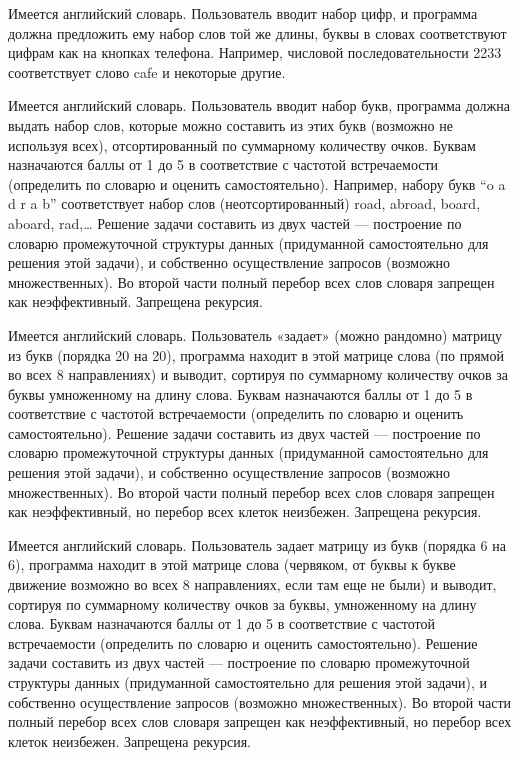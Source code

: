 Имеется английский словарь. Пользователь вводит набор цифр, и программа должна
предложить ему набор слов той же длины, буквы в словах соответствуют цифрам
как на кнопках телефона. Например, числовой последовательности 2233
соответствует слово cafe и некоторые другие.


Имеется английский словарь. Пользователь вводит набор букв, программа должна
выдать набор слов, которые можно составить из этих букв (возможно не используя
всех), отсортированный по суммарному количеству очков. Буквам назначаются
баллы от 1 до 5 в соответствие с частотой встречаемости (определить по словарю
и оценить самостоятельно). Например, набору букв “o a d r a b” соответствует
набор слов (неотсортированный) road, abroad, board, aboard, rad,… Решение
задачи составить из двух частей — построение по словарю промежуточной
структуры данных (придуманной самостоятельно для решения этой задачи), и
собственно осуществление запросов (возможно множественных). Во второй части
полный перебор всех слов словаря запрещен как неэффективный. Запрещена
рекурсия.


Имеется английский словарь. Пользователь «задает» (можно рандомно) матрицу из
букв (порядка 20 на 20), программа находит в этой матрице слова (по прямой во
всех 8 направлениях) и выводит, сортируя по суммарному количеству очков за
буквы умноженному на длину слова. Буквам назначаются баллы от 1 до 5 в
соответствие с частотой встречаемости (определить по словарю и оценить
самостоятельно). Решение задачи составить из двух частей — построение по
словарю промежуточной структуры данных (придуманной самостоятельно для решения
этой задачи), и собственно осуществление запросов (возможно множественных). Во
второй части полный перебор всех слов словаря запрещен как неэффективный, но
перебор всех клеток неизбежен. Запрещена рекурсия.


Имеется английский словарь. Пользователь задает матрицу из букв (порядка 6 на
6), программа находит в этой матрице слова (червяком, от буквы к букве
движение возможно во всех 8 направлениях, если там еще не были) и выводит,
сортируя по суммарному количеству очков за буквы, умноженному на длину слова.
Буквам назначаются баллы от 1 до 5 в соответствие с частотой встречаемости
(определить по словарю и оценить самостоятельно). Решение задачи составить из
двух частей — построение по словарю промежуточной структуры данных
(придуманной самостоятельно для решения этой задачи), и собственно
осуществление запросов (возможно множественных). Во второй части полный
перебор всех слов словаря запрещен как неэффективный, но перебор всех клеток
неизбежен. Запрещена рекурсия.

